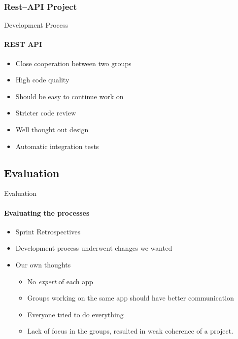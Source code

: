 	\subsubsection{Rest--API Project}
		\begin{frame}[t]{Development Process}\framesubtitle{REST API}
	
    \begin{itemize}
        \item Close cooperation between two groups
        \item High code quality
        \item Should be easy to continue work on
        \item Stricter code review
        \item Well thought out design
        \item Automatic integration tests
    \end{itemize}
	\end{frame}

	\subsection{Evaluation}
		\begin{frame}[t]{Evaluation}\framesubtitle{Evaluating the processes}
	
    \begin{itemize}
        \item Sprint Retrospectives
        \item Development process underwent changes we wanted
        \item Our own thoughts
        	\begin{itemize}
        		\item No \textit{expert} of each app
        		\item Groups working on the same app should have better communication
        		\item Everyone tried to do everything
        		\item Lack of focus in the groups, resulted in weak coherence of a project.
        	\end{itemize}
    \end{itemize}
	\end{frame}